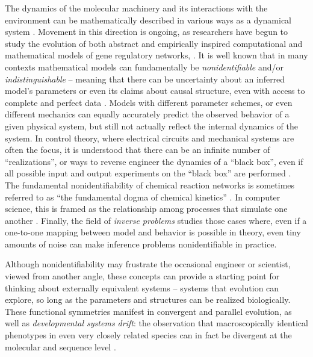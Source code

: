\documentclass{article}
\newcommand{\1}{\mathbbm{1}}
\begin{document}
The dynamics of the molecular machinery and its interactions with the environment
can be mathematically described in various ways as a dynamical system \citep{jaeger2015comet}.
Movement in this direction is ongoing, as researchers have begun to study 
the evolution of both abstract \citep{wagner1994evolution, wagner1996does, siegal2002waddington, bergman2003evolutionary, draghi2015robustness} 
and empirically inspired computational and mathematical models of gene regulatory networks,
\citep[e.g.][]{mjolsness1991connectionist, jaeger2004dynamic, maria1, vitaly1, vitaly2, crombach2016gap, wotton2015quantitative, chertkova2017insilico}.
It is well known that in many contexts mathematical models
can fundamentally be \emph{nonidentifiable} and/or \emph{indistinguishable} -- meaning that 
there can be uncertainty about an inferred model's parameters or even its claims about
causal structure, even with access to complete and perfect data \citep{bellman1970structural, grewal1976identifiability, walter1984structural}. 
Models with different parameter schemes, or even different mechanics 
can equally accurately predict the observed behavior of a given physical system, 
but still not actually reflect the internal dynamics of the system.
In control theory, where electrical circuits and mechanical systems are often the focus, 
it is understood that there can be an infinite number of ``realizations'', 
or ways to reverse engineer the dynamics of a ``black box'',
even if all possible input and output experiments on the ``black box'' are performed 
\citep{kalman1963mathematical, anderson1966equivalence, zadeh1976linear}. 
The fundamental nonidentifiability of chemical reaction networks is sometimes referred to as ``the fundamental dogma of chemical kinetics'' \citep{craciun2008identifiability}. 
In computer science, this is framed as the relationship among processes that simulate one another \citep{van2004equivalence}.
Finally,
the field of \emph{inverse problems} studies those cases where,
even if a one-to-one mapping between model and behavior is possible in theory,
even tiny amounts of noise can make inference problems nonidentifiable in practice.

Although nonidentifiability may frustrate the occasional engineer or scientist, viewed from another angle,
these concepts can provide a starting point for thinking about externally equivalent systems
-- systems that evolution can explore, so long as the parameters and structures can be realized biologically.
These functional symmetries manifest in convergent and parallel evolution, 
as well as \emph{developmental systems drift}: the observation that
macroscopically identical phenotypes in even very closely related species can in fact be divergent at the molecular and sequence level 
\citep{true2001developmental, tsong2006evolution, hare2008sepsid, vierstra2014mouse, stergachis2014conservation}.
\end{document}

